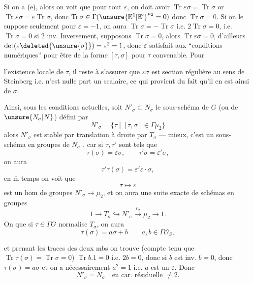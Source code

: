 Si on a (e), alors on voit que pour tout  $\varepsilon$,
on doit avoir $\operatorname{Tr}\varepsilon\sigma=\operatorname{Tr}\sigma$
or $\operatorname{Tr}\varepsilon\sigma=\varepsilon\operatorname{Tr}\sigma$, donc
$\operatorname{Tr}\sigma\in\Gamma(\unsure{\mathbb E^1|\mathbb E'}^{\mu_2}=0)$
donc $\operatorname{Tr}\sigma=0$. Si on le suppose seulement pour $\varepsilon=-1$,
on aura $\operatorname{Tr}\sigma=-\operatorname{Tr}\sigma$ i.e.
$2\operatorname{Tr}\sigma=0$, i.e. $\operatorname{Tr}\sigma=0$ si $2$ inv.
Inversement, supposons $\operatorname{Tr}\sigma=0$, alors
$\operatorname{Tr}\varepsilon\sigma=0$, d'ailleurs
$\det(\varepsilon\deleted{\unsure{\sigma}})=\varepsilon^2=1$, donc $\varepsilon$ satisfait
aux ``conditions numériques'' pour être de la forme $[\tau,\sigma]$ pour
$\tau$ convenable. Pour

 l'existence locale de $\tau$, il reste à s'assurer que
$\varepsilon\sigma$ est section régulière au sens de Steinberg i.e. n'est nulle part
un scalaire, ce qui provient du fait qu'il en est ainsi de $\sigma$.

Ainsi, sous les conditions actuelles, soit $N'_\sigma\subset N_\sigma$ le sous-schéma de
 $G$ (ou de $\unsure{N_\sigma|N}$) défini par
\[
\tag{22}
N'_\sigma=\{\tau\mid[\tau,\sigma]\in\Gamma\mu_2\}
\]
alors $N'_\sigma$ est stable par translation à droite par $T_\sigma$ --- mieux,
c'est un sous-schéma en groupes de $N_\sigma$ , car si
$\tau,\tau'$ sont tels que
\[
\tau(\sigma)=\varepsilon\sigma,\qquad\tau'\sigma=\varepsilon'\sigma,
\]
on aura
\[
\tau'\tau(\sigma)=\varepsilon'\varepsilon\cdot\sigma,
\]
en $\overline{\mathrm m}$ temps on voit que
\[
\tau\longmapsto\varepsilon
\]
est un hom de groupes $N'_\sigma\longrightarrow\mu_2$, et on aura une suite exacte de
schémas en groupes
\[
\tag{23}
1\longrightarrow T_\sigma\hookrightarrow N'_\sigma
\xrightarrow{\varepsilon_\sigma}\mu_2\longrightarrow1.
\]
On  que si $\tau\in\Gamma G$ normalise $T_\sigma$, on aura
\[
\tau(\sigma)=a\sigma+b\qquad a,b\in\Gamma\mathcal O_S,
\]

et prenant les traces des deux mbs on trouve (compte tenu que
$\operatorname{Tr}\tau(\sigma)=\operatorname{Tr}\sigma=0$)
$\operatorname{Tr}b.1=0$ i.e. $2b=0$, donc si $b$ est inv.
$b=0$, donc $\tau(\sigma)=a\sigma$ et on a nécessairement $a^2=1$ i.e. $a$ est un
$\varepsilon$. Donc
\[
\tag{24}
N'_\sigma=N_\sigma\quad\text{en car. résiduelle }\ne2.
\]

